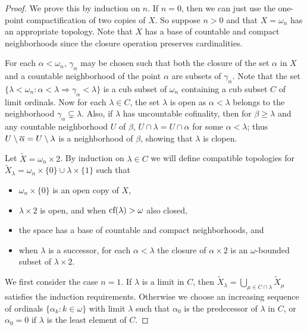 \documentclass{amsart}
\theoremstyle{plain}
\theoremstyle{definition}
\theoremstyle{remark}
\theoremstyle{plain}
\theoremstyle{definition}
\theoremstyle{remark}
\begin{document}
  \begin{proof}
    We prove this by induction on \(n\).
    If \(n=0\), then we can just use the one-point compactification of two
    copies of \(X\). So suppose \(n>0\) and
    that \(X=\omega_n\) has an appropriate topology. Note that \(X\) has
    a base of countable and compact neighborhoods since the closure operation
    preserves cardinalities.

    For each \(\alpha<\omega_n\), \(\gamma_\alpha\) may be chosen such that
    both the closure of the set \(\alpha\) in \(X\) and a countable
    neighborhood of the point \(\alpha\) are subsets of \(\gamma_\alpha\).
    Note that the set
    \(\{\lambda<\omega_n:\alpha<\lambda\Rightarrow\gamma_\alpha<\lambda\}\)
    is a cub subset of \(\omega_n\) containing a cub subset \(C\)
    of limit ordinals.
    Now for each \(\lambda\in C\), the set \(\lambda\) is
    open as \(\alpha<\lambda\) belongs to the neighborhood
    \(\gamma_\alpha\subsetneq\lambda\). Also, if \(\lambda\) has uncountable
    cofinality, then for \(\beta\geq\lambda\) and any countable neighborhood
    \(U\) of \(\beta\), \(U\cap\lambda=U\cap\alpha\)
    for some \(\alpha<\lambda\); thus \(U\setminus\overline{\alpha}=U\setminus\lambda\)
    is a neighborhood of \(\beta\), showing that \(\lambda\)
    is clopen.

    Let \(\tilde X=\omega_n\times 2\).
    By induction on \(\lambda \in C\) we will define compatible topologies
    for \(\tilde X_\lambda=\omega_n\times\{0\}\cup\lambda\times\{1\}\)
    such that
    \begin{itemize}
      \item \(\omega_n \times \{0\}\) is an open copy of \(X\),
      \item \(\lambda\times 2\) is open, and when \(\textrm{cf}(\lambda)>\omega\) also closed,
      \item the space has a base of countable and compact neighborhoods, and
      \item when \(\lambda\) is a successor,
        for each \(\alpha<\lambda\) the closure of \(\alpha\times 2\) is
        an \(\omega\)-bounded  subset of \(\lambda\times 2\).
    \end{itemize}

    We first consider the case \(n=1\).
    If \(\lambda\) is a limit in \(C\), then
    \(
      \tilde X_\lambda
        =
      \bigcup_{\mu\in C\cap\lambda}\tilde X_\mu
    \)
    satisfies the induction requirements.
    Otherwise we choose an increasing sequence of
    ordinals \(\{\alpha_k : k\in \omega\}\) with limit \(\lambda\)
    such that \(\alpha_0\) is the predecessor of \(\lambda\) in \(C\),
    or \(\alpha_0=0\) if \(\lambda\) is the least element of \(C\).


\end{proof}
\end{document}
